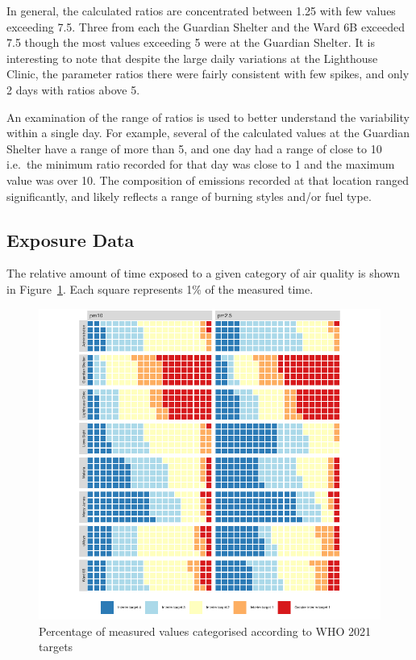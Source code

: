 \documentclass[
  authoryear,
  review,
  3p]{elsarticle}
\begin{document}
In general, the calculated ratios are concentrated between 1.25 with few
values exceeding 7.5. Three from each the Guardian Shelter and the Ward
6B exceeded 7.5 though the most values exceeding 5 were at the Guardian
Shelter. It is interesting to note that despite the large daily
variations at the Lighthouse Clinic, the parameter ratios there were
fairly consistent with few spikes, and only 2 days with ratios above 5.

An examination of the range of ratios is used to better understand the
variability within a single day. For example, several of the calculated
values at the Guardian Shelter have a range of more than 5, and one day
had a range of close to 10 i.e.~the minimum ratio recorded for that day
was close to 1 and the maximum value was over 10. The composition of
emissions recorded at that location ranged significantly, and likely
reflects a range of burning styles and/or fuel type.

\hypertarget{exposure-data}{%
\subsection{Exposure Data}\label{exposure-data}}

The relative amount of time exposed to a given category of air quality
is shown in Figure~\ref{fig-percent-exposure}. Each square represents
1\% of the measured time.

\begin{figure}

{\centering \includegraphics{manuscript-qech-air-quality-tilley_files/figure-pdf/fig-percent-exposure-1.pdf}

}

\caption{\label{fig-percent-exposure}Percentage of measured values
categorised according to WHO 2021 targets}

\end{figure}
\end{document}

